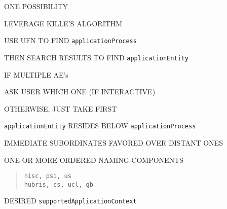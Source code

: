 \begin{bwslide}

\begin{nrtc}
\item	ONE POSSIBILITY
    \begin{nrtc}
    \item	LEVERAGE KILLE'S ALGORITHM
    \end{nrtc}

\item	USE UFN TO FIND \verb"applicationProcess"

\item	THEN SEARCH RESULTS TO FIND \verb"applicationEntity"

\item	IF MULTIPLE AE's
    \begin{nrtc}
    \item	ASK USER WHICH ONE (IF INTERACTIVE)

    \item	OTHERWISE, JUST TAKE FIRST
    \end{nrtc}
\end{nrtc}
\end{bwslide}


\begin{bwslide}

\begin{nrtc}
\item	\verb"applicationEntity" RESIDES BELOW \verb"applicationProcess"

\item	IMMEDIATE SUBORDINATES FAVORED OVER DISTANT ONES
\end{nrtc}
\end{bwslide}


\begin{bwslide}

\begin{nrtc}
\item	ONE OR MORE ORDERED NAMING COMPONENTS
\begin{quote}\small\begin{verbatim}
nisc, psi, us
hubris, cs, ucl, gb
\end{verbatim}\end{quote}

\item	DESIRED \verb"supportedApplicationContext"
\end{nrtc}
\end{bwslide}


